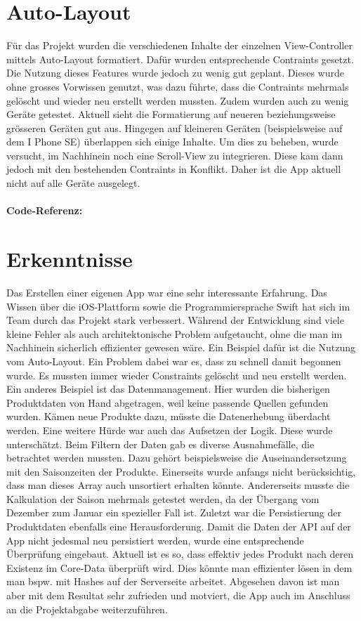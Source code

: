 \documentclass[12pt,titlepage]{article}
\begin{document}
\section*{Auto-Layout}
Für das Projekt wurden die verschiedenen Inhalte der einzelnen View-Controller mittels Auto-Layout formatiert. Dafür wurden entsprechende Contraints gesetzt. Die Nutzung dieses Features wurde jedoch zu wenig gut geplant. Dieses wurde ohne grosses Vorwissen genutzt, was dazu führte, dass die Contraints mehrmals gelöscht und wieder neu erstellt werden mussten. Zudem wurden auch zu wenig Geräte getestet. Aktuell sieht die Formatierung auf neueren beziehungsweise grösseren Geräten gut aus. Hingegen auf kleineren Geräten (beispielsweise auf dem I Phone SE) überlappen sich einige Inhalte. Um dies zu beheben, wurde versucht, im Nachhinein noch eine Scroll-View zu integrieren. Diese kam dann jedoch mit den bestehenden Contraints in Konflikt. Daher ist die App aktuell nicht auf alle Geräte ausgelegt.\\
\\
\textbf{Code-Referenz: }\\ 

\section*{Erkenntnisse}
Das Erstellen einer eigenen App war eine sehr interessante Erfahrung. Das Wissen über die iOS-Plattform sowie die Programmiersprache \glqq Swift\grqq{} hat sich im Team durch das Projekt stark verbessert. Während der Entwicklung sind viele kleine Fehler als auch architektonische Problem aufgetaucht, ohne die man im Nachhinein sicherlich effizienter gewesen wäre. Ein Beispiel dafür ist die Nutzung vom Auto-Layout. Ein Problem dabei war es, dass zu schnell damit begonnen wurde. Es mussten immer wieder Constraints gelöscht und neu erstellt werden. Ein anderes Beispiel ist das Datenmanagement. Hier wurden die bisherigen Produktdaten von Hand abgetragen, weil keine passende Quellen gefunden wurden. Kämen neue Produkte dazu, müsste die Datenerhebung überdacht werden. Eine weitere Hürde war auch das Aufsetzen der Logik. Diese wurde unterschätzt. Beim Filtern der Daten gab es diverse Ausnahmefälle, die betrachtet werden mussten. Dazu gehört beispielsweise die Auseinandersetzung mit den Saisonzeiten der Produkte. Einerseits wurde anfangs nicht berücksichtig, dass man dieses Array auch unsortiert erhalten könnte. Andererseits musste die Kalkulation der Saison mehrmals getestet werden, da der Übergang vom Dezember zum Januar ein spezieller Fall ist. Zuletzt war die Persistierung der Produktdaten ebenfalls eine Herausforderung. Damit die Daten der API auf der App nicht jedesmal neu persistiert werden, wurde eine entsprechende Überprüfung eingebaut. Aktuell ist es so, dass effektiv jedes Produkt nach deren Existenz im Core-Data überprüft wird. Dies könnte man effizienter lösen in dem man bspw. mit Hashes auf der Serverseite arbeitet. Abgesehen davon ist man aber mit dem Resultat sehr zufrieden und motviert, die App auch im Anschluss an die Projektabgabe weiterzuführen.
\end{document}
